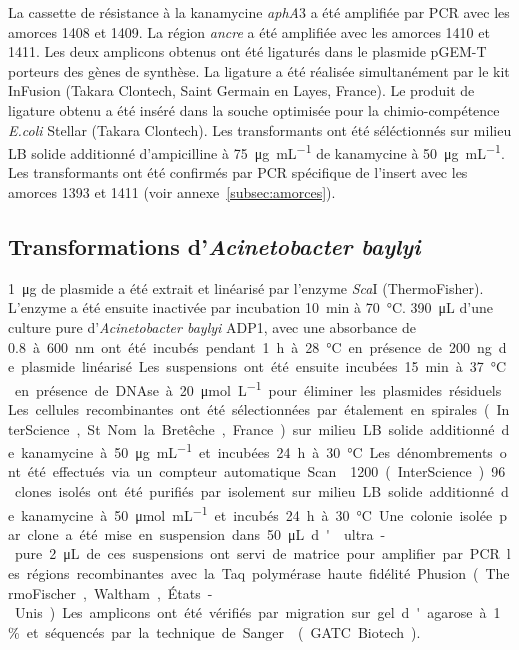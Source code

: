 La cassette de résistance à la kanamycine \emph{aphA}3 a été amplifiée par PCR
avec les amorces 1408 et 1409. La région \emph{ancre} a été amplifiée avec les
amorces 1410 et 1411. Les deux amplicons obtenus ont été ligaturés dans le
plasmide pGEM-T porteurs des gènes de synthèse. La ligature a été réalisée
simultanément par le kit InFusion (Takara Clontech, Saint Germain en Layes,
France). Le produit de ligature obtenu a été inséré dans la souche optimisée
pour la chimio-compétence \emph{E.coli} Stellar (Takara Clontech). Les
transformants ont été séléctionnés sur milieu LB solide additionné d'ampicilline
à \SI{75}{\ug\per\mL} de kanamycine à \SI{50}{\ug\per\mL}. Les transformants ont
été confirmés par PCR spécifique de l'insert avec les amorces 1393 et 1411 (voir
annexe~\ref{subsec:amorces}).

\subsection{Transformations d'\emph{Acinetobacter baylyi}}
\label{subsec:transfo}

\SI{1}{\ug} de plasmide a été extrait et linéarisé par l'enzyme \emph{Sca}I
(ThermoFisher). L'enzyme a été ensuite inactivée par incubation \SI{10}{\minute}
à \SI{70}{\celsius}. \SI{390}{\uL} d'une culture pure d'\emph{Acinetobacter
  baylyi} ADP1, avec une absorbance de \SI{0,8} à \SI{600}{\nm} ont été incubés
pendant \SI{1}{\hour} à \SI{28}{\celsius} en présence de \SI{200}{\ng} de
plasmide linéarisé. Les suspensions ont été ensuite incubées \SI{15}{\minute} à
\SI{37}{\celsius} en présence de DNAse à \SI{20}{\umol\per\L} pour éliminer les
plasmides résiduels. Les cellules recombinantes ont été sélectionnées par
étalement en spirales (InterScience, St Nom la Bretêche, France) sur milieu LB
solide additionné de kanamycine à \SI{50}{\ug\per\mL} et incubées \SI{24}{\hour}
à \SI{30}{\celsius}. Les dénombrements ont été effectués via un compteur
automatique Scan\textsuperscript{\textregistered}1200 (InterScience).

96 clones isolés ont été purifiés par isolement sur milieu LB solide additionné
de kanamycine à \SI{50}{\umol\per\mL} et incubés \SI{24}{\hour} à
\SI{30}{\celsius}. Une colonie isolée par clone a été mise en suspension dans
\SI{50}{\uL} d' ultra-pure. \SI{2}{\uL} de ces suspensions ont servi de
matrice pour amplifier par PCR les régions recombinantes avec la Taq polymérase
haute fidélité Phusion (ThermoFischer, Waltham, États-Unis). Les amplicons ont
été vérifiés par migration sur gel d'agarose à 1\% et séquencés par la technique
de Sanger\cite{sanger_dna_1977} (GATC Biotech).

